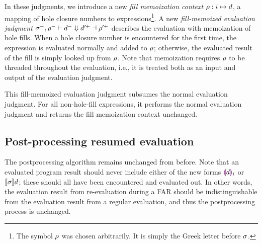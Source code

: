 \begin{singlespace}
\end{singlespace}

In these judgments, we introduce a new \textit{fill memoization context} $\rho:i\mapsto d$, a mapping of hole closure numbers to expressions\footnote{The symbol $\rho$ was chosen arbitrarily. It is simply the Greek letter before $\sigma$.}. A new \textit{fill-memoized evaluation judgment} $\sigma^-,\rho^-\vdash d^-\Downarrow d'^+\dashv\rho'^+$ describes the evaluation with memoization of hole fills. When a hole closure number is encountered for the first time, the expression is evaluated normally and added to $\rho$; otherwise, the evaluated result of the fill is simply looked up from $\rho$. Note that memoization requires $\rho$ to be threaded throughout the evaluation, i.e., it is treated both as an input and output of the evaluation judgment.

This fill-memoized evaluation judgment subsumes the normal evaluation judgment. For all non-hole-fill expressions, it performs the normal evaluation judgment and returns the fill memoization context unchanged.

\subsection{Post-processing resumed evaluation}
\label{sec:far-postprocessing}

The postprocessing algorithm remains unchanged from before. Note that an evaluated program result should never include either of the new forms $\textcolor{violet}{\llparenthesis} d\textcolor{violet}{\rrparenthesis}_i$ or $\llbracket\sigma\rrbracket d$; these should all have been encountered and evaluated out. In other words, the evaluation result from re-evaluation during a FAR should be indistinguishable from the evaluation result from a regular evaluation, and thus the postprocessing process is unchanged.

